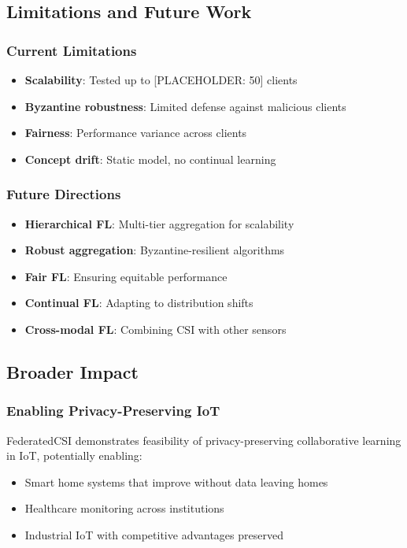 \documentclass[journal]{IEEEtran}
\begin{document}
\subsection{Limitations and Future Work}

\subsubsection{Current Limitations}
\begin{itemize}
\item \textbf{Scalability}: Tested up to [PLACEHOLDER: 50] clients
\item \textbf{Byzantine robustness}: Limited defense against malicious clients
\item \textbf{Fairness}: Performance variance across clients
\item \textbf{Concept drift}: Static model, no continual learning
\end{itemize}

\subsubsection{Future Directions}
\begin{itemize}
\item \textbf{Hierarchical FL}: Multi-tier aggregation for scalability
\item \textbf{Robust aggregation}: Byzantine-resilient algorithms
\item \textbf{Fair FL}: Ensuring equitable performance
\item \textbf{Continual FL}: Adapting to distribution shifts
\item \textbf{Cross-modal FL}: Combining CSI with other sensors
\end{itemize}

\subsection{Broader Impact}

\subsubsection{Enabling Privacy-Preserving IoT}
FederatedCSI demonstrates feasibility of privacy-preserving collaborative learning in IoT, potentially enabling:
\begin{itemize}
\item Smart home systems that improve without data leaving homes
\item Healthcare monitoring across institutions
\item Industrial IoT with competitive advantages preserved
\end{itemize}
\end{document}
